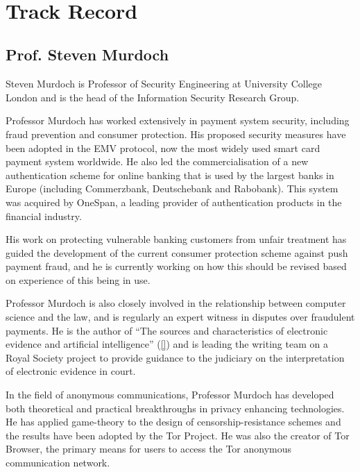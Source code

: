 
\



\section{Track Record}

\subsection{Prof. Steven Murdoch}

Steven Murdoch is Professor of Security Engineering at University College London and is the head of the Information Security Research Group. 

Professor Murdoch has worked extensively in payment system security, including fraud prevention and consumer protection.
His proposed security measures have been adopted in the EMV protocol, now the most widely used smart card payment system worldwide.
He also led the commercialisation of a new authentication scheme for online banking that is used by the largest banks in Europe (including Commerzbank, Deutschebank and Rabobank).
This system was acquired by OneSpan, a leading provider of authentication products in the financial industry.

His work on protecting vulnerable banking customers from unfair treatment has guided the development of the current consumer protection scheme against push payment fraud, and he is currently working on how this should be revised based on experience of this being in use.

Professor Murdoch is also closely involved in the relationship between computer science and the law, and is regularly an expert witness in disputes over fraudulent payments.
He is the author of ``The sources and characteristics of electronic evidence and artificial intelligence'' (\href{https://humanities-digital-library.org/index.php/hdl/catalog/book/electronic-evidence-and-electronic-signatures}{[\x]}) and is leading the writing team on a Royal Society
project to provide guidance to the judiciary on the interpretation of electronic evidence in court.

In the field of anonymous communications, Professor Murdoch has developed both theoretical and practical breakthroughs in privacy enhancing technologies.
He has applied game-theory to the design of censorship-resistance schemes and the results have been adopted by the Tor Project.
He was also the creator of Tor Browser, the primary means for users to access the Tor anonymous communication network.

